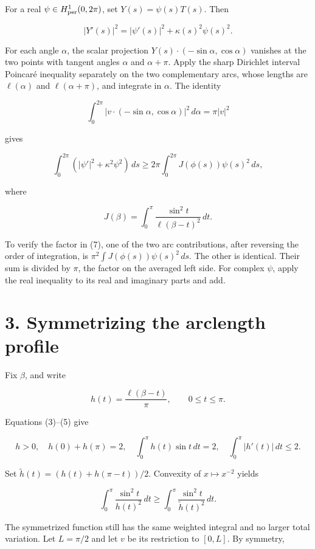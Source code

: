 \documentclass[11pt,a4paper]{article}
\begin{document}
For a real \(\psi\in H^1_{\rm per}(0,2\pi)\), set \(Y(s)=\psi(s)T(s)\).
Then

\[
|Y'(s)|^2=|\psi'(s)|^2+\kappa(s)^2\psi(s)^2.
\tag{6}
\]

For each angle \(\alpha\), the scalar projection
\(Y(s)\cdot(-\sin\alpha,\cos\alpha)\) vanishes at the two points with
tangent angles \(\alpha\) and \(\alpha+\pi\). Apply the sharp Dirichlet
interval Poincaré inequality separately on the two complementary arcs,
whose lengths are \(\ell(\alpha)\) and \(\ell(\alpha+\pi)\), and
integrate in \(\alpha\). The identity

\[
\int_0^{2\pi}|v\cdot(-\sin\alpha,\cos\alpha)|^2\,d\alpha
=\pi|v|^2
\]

gives

\[
\int_0^{2\pi}(|\psi'|^2+\kappa^2\psi^2)\,ds
\ge2\pi\int_0^{2\pi}J(\phi(s))\psi(s)^2\,ds,
\tag{7}
\]

where

\[
J(\beta)=\int_0^\pi
\frac{\sin^2t}{\ell(\beta-t)^2}\,dt.
\tag{8}
\]

To verify the factor in (7), one of the two arc contributions, after
reversing the order of integration, is
\(\pi^2\int J(\phi(s))\psi(s)^2\,ds\). The other is identical. Their sum
is divided by \(\pi\), the factor on the averaged left side. For complex
\(\psi\), apply the real inequality to its real and imaginary parts and
add.

\hypertarget{1034-symmetrizing-the-arclength-profile}{%
\section{3. Symmetrizing the arclength
profile}\label{1034-symmetrizing-the-arclength-profile}}

Fix \(\beta\), and write

\[
h(t)=\frac{\ell(\beta-t)}\pi,\qquad 0\le t\le\pi.
\]

Equations (3)--(5) give

\[
h>0,\quad h(0)+h(\pi)=2,\quad
\int_0^\pi h(t)\sin t\,dt=2,\quad
\int_0^\pi|h'(t)|\,dt\le2.
\tag{9}
\]

Set \(\widetilde h(t)=(h(t)+h(\pi-t))/2\). Convexity of
\(x\mapsto x^{-2}\) yields

\[
\int_0^\pi\frac{\sin^2t}{h(t)^2}\,dt
\ge\int_0^\pi\frac{\sin^2t}{\widetilde h(t)^2}\,dt.
\tag{10}
\]

The symmetrized function still has the same weighted integral and no
larger total variation. Let \(L=\pi/2\) and let \(v\) be its restriction
to \([0,L]\). By symmetry,
\end{document}
